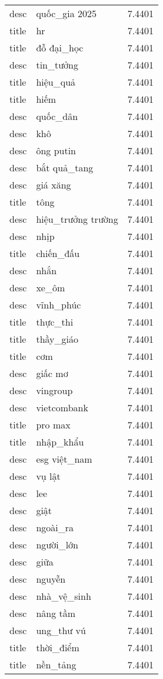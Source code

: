\documentclass{article}
\begin{document}
\begin{tabular}{lll}
desc & quốc\_gia 2025 & 7.4401\\
title & hr & 7.4401\\
title & đỗ đại\_học & 7.4401\\
desc & tin\_tưởng & 7.4401\\
title & hiệu\_quả & 7.4401\\
title & hiếm & 7.4401\\
desc & quốc\_dân & 7.4401\\
desc & khô & 7.4401\\
desc & ông putin & 7.4401\\
desc & bắt quả\_tang & 7.4401\\
desc & giá xăng & 7.4401\\
title & tông & 7.4401\\
desc & hiệu\_trưởng trường & 7.4401\\
desc & nhịp & 7.4401\\
title & chiến\_đấu & 7.4401\\
desc & nhắn & 7.4401\\
desc & xe\_ôm & 7.4401\\
desc & vĩnh\_phúc & 7.4401\\
title & thực\_thi & 7.4401\\
title & thầy\_giáo & 7.4401\\
title & cơm & 7.4401\\
desc & giấc mơ & 7.4401\\
desc & vingroup & 7.4401\\
desc & vietcombank & 7.4401\\
title & pro max & 7.4401\\
title & nhập\_khẩu & 7.4401\\
desc & esg việt\_nam & 7.4401\\
desc & vụ lật & 7.4401\\
desc & lee & 7.4401\\
desc & giật & 7.4401\\
desc & ngoài\_ra & 7.4401\\
desc & người\_lớn & 7.4401\\
desc & giữa & 7.4401\\
desc & nguyễn & 7.4401\\
desc & nhà\_vệ\_sinh & 7.4401\\
desc & nâng tầm & 7.4401\\
desc & ung\_thư vú & 7.4401\\
title & thời\_điểm & 7.4401\\
title & nền\_tảng & 7.4401\\

\end{tabular}
\end{document}
